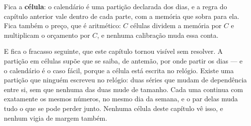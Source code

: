 Fica a \textbf{célula}: o calendário é uma partição declarada dos dias, e a regra do capítulo
anterior vale dentro de cada parte, com a memória que sobra para ela. Fica também o preço, que é aritmético: $C$ células dividem a memória por $C$ e multiplicam o orçamento por $C$, e nenhuma calibração muda essa conta.

E fica o fracasso seguinte, que este capítulo tornou visível sem resolver. A partição em
células supõe que se saiba, de antemão, por onde partir os dias --- e o calendário é o caso
fácil, porque a célula está escrita no relógio. Existe uma partição que ninguém escreveu no relógio: duas séries que mudam de dependência entre si, sem que nenhuma das duas mude de
tamanho. Cada uma continua com exatamente os mesmos números, no mesmo dia da semana, e o
par delas muda tudo o que se pode perder junto. Nenhuma célula deste capítulo vê isso, e
nenhum vigia de margem também.
